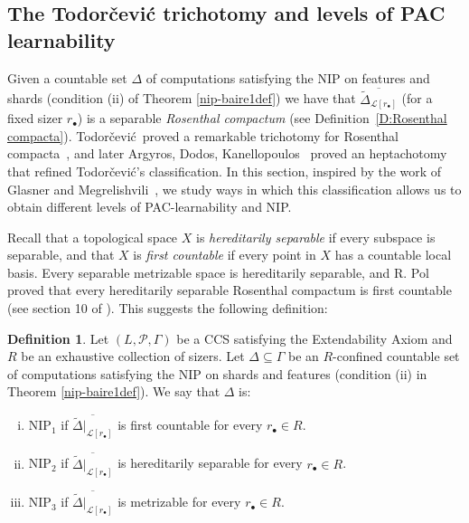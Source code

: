 \documentclass[psamsfonts]{amsart}
\theoremstyle{definition}
\newtheorem{defn}[thm]{Definition}
\theoremstyle{remark}
\numberwithin{equation}{section}
\begin{document}
\subsection{The Todorčević trichotomy  and levels of PAC learnability}

Given a countable set $\Delta$ of computations satisfying the NIP on features and shards (condition (ii) of Theorem \ref{nip-baire1def}) we have that $\overline{\tilde\Delta_{\mathcal{L}[r_\bullet]}}$ (for a fixed sizer $r_\bullet$) is a separable \textit{Rosenthal compactum} (see Definition~\ref{D:Rosenthal compacta}).
Todorčević\ proved a remarkable trichotomy for Rosenthal compacta~\cite{Todorcevic_1999_CompactSubsetsBaire}, and later Argyros, Dodos, Kanellopoulos~\cite{argyros2008rosenthal} proved an heptachotomy that refined Todorčević's classification.
In this section, inspired by the work of Glasner and Megrelishvili~\cite{glasner2022tame}, we study ways in which this classification allows us to obtain different levels of PAC-learnability  and NIP.



Recall that a topological space $X$ is \emph{hereditarily separable} if every subspace is separable, and that $X$ is \emph{first countable} if every point in $X$ has a countable local basis.
Every separable metrizable space is hereditarily separable, and  R.
Pol proved that every hereditarily separable Rosenthal compactum is first countable (see section 10 of \cite{debs2013rosenthal}).
This suggests the following definition:

\begin{defn}
    Let $(L,\mathcal{P},\Gamma)$ be a CCS satisfying the Extendability Axiom and $R$ be an exhaustive collection of sizers.
Let $\Delta\subseteq\Gamma$ be an $R$-confined countable set of computations satisfying the NIP on shards and features (condition (ii) in Theorem \ref{nip-baire1def}).
We say that $\Delta$ is:
    \begin{enumerate}[(i)]
        \item
        NIP$_1$ if $\overline{\tilde\Delta|_{\mathcal{L}[r_\bullet]}}$ is first countable for every $r_\bullet\in R$.
        \item
        NIP$_2$ if $\overline{\tilde\Delta|_{\mathcal{L}[r_\bullet]}}$ is hereditarily separable for every $r_\bullet\in R$.
        \item
        NIP$_3$ if $\overline{\tilde\Delta|_{\mathcal{L}[r_\bullet]}}$ is metrizable for every $r_\bullet\in R$.
    \end{enumerate}
\end{defn}
\end{document}
